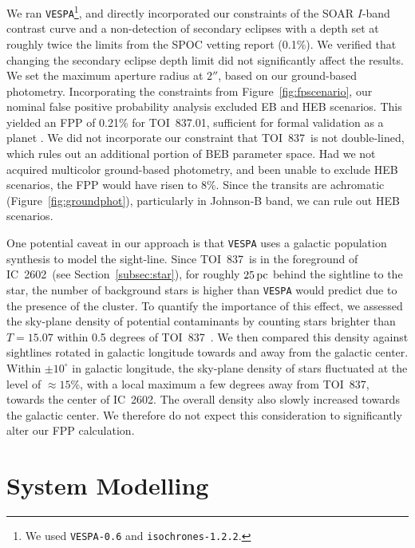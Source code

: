\documentclass[12pt,twocolumn,tighten]{aastex63}
\newcommand{\tn}{TOI~837} %
\newcommand{\pn}{TOI~837.01} %
\newcommand{\cn}{IC~2602} %
\begin{document}
We ran \texttt{VESPA}\footnote{We used \texttt{VESPA-0.6} and
\texttt{isochrones-1.2.2}.}, and directly incorporated our constraints
of the SOAR $I$-band contrast curve and a non-detection of secondary
eclipses with a depth set at roughly twice the limits from the SPOC
vetting report (0.1\%).  We verified that changing the secondary
eclipse depth limit did not significantly affect the results.  We set
the maximum aperture radius at $2''$, based on our ground-based
photometry.  Incorporating the constraints from
Figure~\ref{fig:fpscenario}, our nominal false positive probability
analysis excluded EB and HEB scenarios.  This yielded an FPP of 0.21\%
for \pn, sufficient for formal validation as a planet
\citep{morton_efficient_2012}.  We did not incorporate our constraint
that \tn\ is not double-lined, which rules out an additional portion
of BEB parameter space.  Had we not acquired multicolor ground-based
photometry, and been unable to exclude HEB scenarios, the FPP would
have risen to 8\%.  Since the transits are achromatic
(Figure~\ref{fig:groundphot}), particularly in Johnson-B band, we can
rule out HEB scenarios.

One potential caveat in our approach is that \texttt{VESPA} uses a galactic
population synthesis to model the sight-line. Since \tn\ is in the
foreground of \cn\ (see Section~\ref{subsec:star}), for roughly
$25\,{\rm pc}$ behind the sightline to the star, the number of
background stars is higher than \texttt{VESPA} would predict due to the
presence of the cluster.  To quantify the importance of this effect,
we assessed the sky-plane density of potential contaminants by
counting stars brighter than $T=15.07$ within 0.5 degrees of \tn\
\citep{stassun_TIC8_2019}. We then compared this density against
sightlines rotated in galactic longitude towards and away from the
galactic center. Within $\pm10^\circ$ in galactic longitude, the
sky-plane density of stars fluctuated at the level of $\approx 15\%$,
with a local maximum a few degrees away from \tn, towards the center of \cn.
The overall density also slowly increased towards the galactic center.
We therefore do not expect this consideration to significantly alter
our FPP calculation.


\section{System Modelling}
\label{sec:system}
\end{document}
